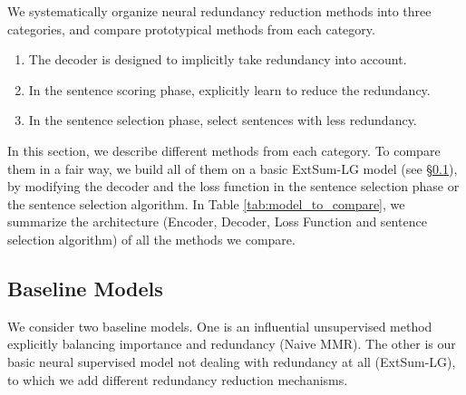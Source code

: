 \documentclass[11pt,a4paper]{article}
\begin{document}
We systematically organize neural redundancy reduction methods into three categories, and compare prototypical methods from each category.
\vspace{-1mm}
\renewcommand{\labelenumi}{\Alph{enumi}}
\begin{enumerate}

    \item The decoder is designed to implicitly take redundancy into account.
\item In the sentence scoring phase, explicitly learn to reduce the redundancy.
\item In the sentence selection phase, select sentences with less redundancy.
\end{enumerate}
\vspace{-1mm}


In this section, we describe different methods from each category. To compare them in a fair way, we build all of them on a basic ExtSum-LG model (see  \S\ref{basic-model}), by modifying the decoder and the loss function in the sentence selection phase or the sentence selection algorithm. In Table \ref{tab:model_to_compare}, we summarize the architecture (Encoder, Decoder, Loss Function and sentence selection algorithm) of all the methods we compare.

\subsection{Baseline Models}
\label{basic-model}
We consider two baseline models. One is an influential unsupervised method explicitly balancing importance and  redundancy (Naive MMR). The other is our basic neural supervised model not dealing with redundancy at all (ExtSum-LG), to which we add different redundancy reduction mechanisms.
\end{document}
